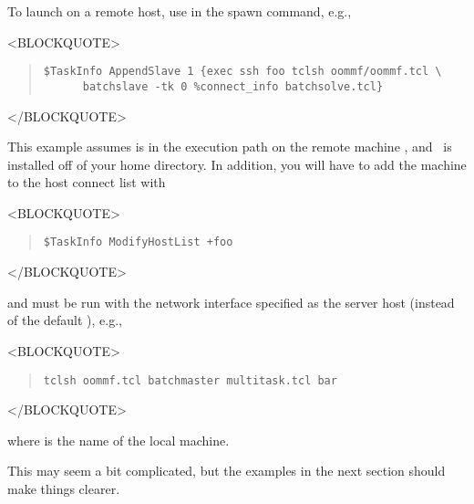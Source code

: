 To launch  on a remote host, use 
in the spawn command, e.g.,
\begin{rawhtml}<BLOCKQUOTE>\end{rawhtml}
\begin{quote}
\begin{verbatim}
$TaskInfo AppendSlave 1 {exec ssh foo tclsh oommf/oommf.tcl \
      batchslave -tk 0 %connect_info batchsolve.tcl}
\end{verbatim}
\end{quote}
\begin{rawhtml}</BLOCKQUOTE>\end{rawhtml}
This example assumes  is in the execution path on the remote
machine , and \OOMMF\ is installed off of your home directory.
In addition, you will have to add the machine \fn{foo} to the host
connect list with
\begin{rawhtml}<BLOCKQUOTE>\end{rawhtml}
\begin{quote}
\begin{verbatim}
$TaskInfo ModifyHostList +foo
\end{verbatim}
\end{quote}
\begin{rawhtml}</BLOCKQUOTE>\end{rawhtml}
and  must be run with the network interface specified
as the server host (instead of the default \fn{localhost}), e.g.,
\begin{rawhtml}<BLOCKQUOTE>\end{rawhtml}
\begin{quote}
\begin{verbatim}
tclsh oommf.tcl batchmaster multitask.tcl bar
\end{verbatim}
\end{quote}
\begin{rawhtml}</BLOCKQUOTE>\end{rawhtml}
where  is the name of the local machine.

This may seem a bit complicated, but the examples in the
next section should make things clearer.

